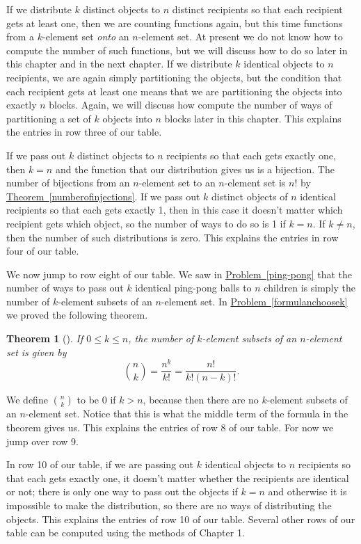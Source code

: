 \documentclass[10pt,]{book}
\theoremstyle{plain}
\newtheorem{theorem}{Theorem}[section]
\theoremstyle{definition}
\theoremstyle{definition}
\numberwithin{equation}{chapter}
\begin{document}
\par
If we distribute \(k\) distinct objects to \(n\) distinct recipients so that each recipient gets at least one, then we are counting functions again, but this time functions from a \(k\)-element set \emph{onto} an \(n\)-element set. At present we do not know how to compute the number of such functions, but we will discuss how to do so later in this chapter and in the next chapter. If we distribute \(k\) identical objects to \(n\) recipients, we are again simply partitioning the objects, but the condition that each recipient gets at least one means that we are partitioning the objects into exactly \(n\) blocks. Again, we will discuss how compute the number of ways of partitioning a set of \(k\) objects into \(n\) blocks later in this chapter. This explains the entries in row three of our table.%
\par
If we pass out \(k\) distinct objects to \(n\) recipients so that each gets exactly one, then \(k=n\) and the function that our distribution gives us is a bijection. The number of bijections from an \(n\)-element set to an \(n\)-element set is \(n!\) by \hyperref[numberofinjections]{Theorem~\ref{numberofinjections}}. If we pass out \(k\) distinct objects of \(n\) identical recipients so that each gets exactly 1, then in this case it doesn't matter which recipient gets which object, so the number of ways to do so is 1 if \(k=n\). If \(k\not=n\), then the number of such distributions is zero. This explains the entries in row four of our table.%
\par
We now jump to row eight of our table. We saw in \hyperref[ping-pong]{Problem~\ref{ping-pong}} that the number of ways to pass out \(k\) identical ping-pong balls to \(n\) children is simply the number of \(k\)-element subsets of an \(n\)-element set. In \hyperref[formulanchoosek]{Problem~\ref{formulanchoosek}} we proved the following theorem.%
\begin{theorem}[{}]\label{theorem-5}
If \(0\le k \le n\), the number of \(k\)-element subsets of an \(n\)-element set is given by%
\begin{equation*}
\binom{n}{k} = \frac{n^{\underline{k}}}{k!}
= \frac{n!}{k!(n-k)!}.
\end{equation*}
%
\end{theorem}
We define \(\binom{n}{k}\) to be 0 if \(k>n\), because then there are no \(k\)-element subsets of an \(n\)-element set. Notice that this is what the middle term of the formula in the theorem gives us. This explains the entries of row 8 of our table. For now we jump over row 9.%
\par
In row 10 of our table, if we are passing out \(k\) identical objects to \(n\) recipients so that each gets exactly one, it doesn't matter whether the recipients are identical or not; there is only one way to pass out the objects if \(k=n\) and otherwise it is impossible to make the distribution, so there are no ways of distributing the objects. This explains the entries of row 10 of our table. Several other rows of our table can be computed using the methods of Chapter 1.%
\typeout{************************************************}
\typeout{************************************************}
\end{document}
